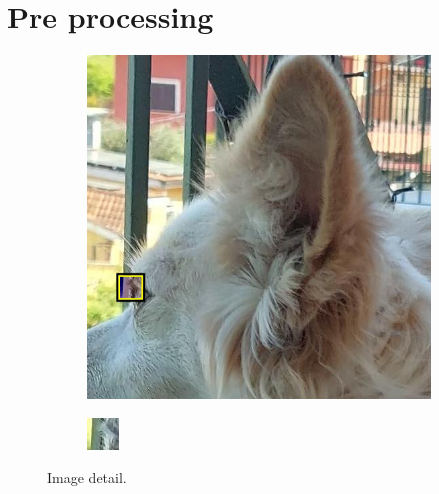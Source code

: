 \section{Pre processing}
\begin{figure}[ht]
    \centering
    \begin{subfigure}{0.4\linewidth}
        \includegraphics[width=\linewidth]{Figures/example_square.png}
    \end{subfigure}
    \hspace{2cm}
    \begin{subfigure}{0.4\linewidth}
        \includegraphics[width=\linewidth]{Figures/example_detail.png}
    \end{subfigure}
    \caption[Pixel grid detail]{Image detail.}
    \label{fig:example_detail}
\end{figure}
